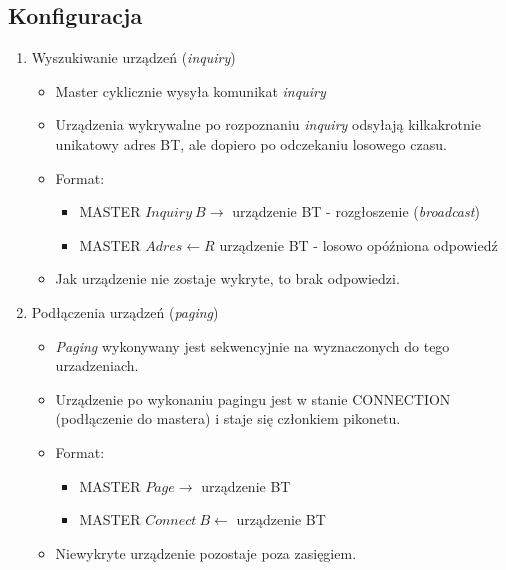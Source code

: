 \subsection{Konfiguracja}
\begin{enumerate}
	\item Wyszukiwanie urządzeń (\emph{inquiry})
	\begin{itemize}
		\item Master cyklicznie wysyła komunikat \emph{inquiry}
		\item Urządzenia wykrywalne po rozpoznaniu \emph{inquiry} odsyłają kilkakrotnie unikatowy adres BT, ale dopiero po odczekaniu losowego czasu.
		\item Format:
		\begin{itemize}
			\item MASTER $ Inquiry\:B \rightarrow $ urządzenie BT - rozgłoszenie (\emph{broadcast})
			\item MASTER $ Adres \leftarrow R $ urządzenie BT - losowo opóźniona odpowiedź
		\end{itemize}
		\item Jak urządzenie nie zostaje wykryte, to brak odpowiedzi.
	\end{itemize}
	\item Podłączenia urządzeń (\emph{paging})
	\begin{itemize}
		\item \emph{Paging} wykonywany jest sekwencyjnie na wyznaczonych do tego urzadzeniach.
		\item Urządzenie po wykonaniu pagingu jest w stanie CONNECTION (podłączenie do mastera) i staje się członkiem pikonetu.
		\item Format:
		\begin{itemize}
			\item MASTER $ Page \rightarrow $ urządzenie BT
			\item MASTER $ Connect\:B \leftarrow $ urządzenie BT
		\end{itemize}
		\item Niewykryte urządzenie pozostaje poza zasięgiem.
	\end{itemize}
\end{enumerate}
